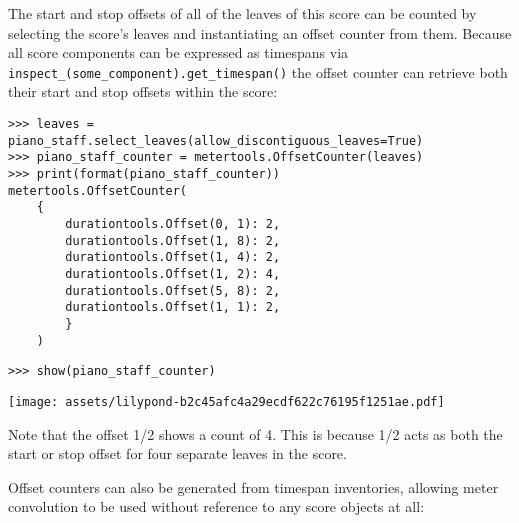 \noindent The start and stop offsets of all of the leaves of this score can be
counted by selecting the score's leaves and instantiating an offset counter
from them. Because all score components can be expressed as timespans via
\texttt{inspect\_(some\_component).get\_timespan()} the offset counter can
retrieve both their start and stop offsets within the score:

\begin{comment}
<abjad>
leaves = piano_staff.select_leaves(allow_discontiguous_leaves=True)
piano_staff_counter = metertools.OffsetCounter(leaves)
print(format(piano_staff_counter))
show(piano_staff_counter)
</abjad>
\end{comment}

\begin{abjadbookoutput}
\begin{singlespacing}
\vspace{-0.5\baselineskip}
\begin{lstlisting}
>>> leaves = piano_staff.select_leaves(allow_discontiguous_leaves=True)
>>> piano_staff_counter = metertools.OffsetCounter(leaves)
>>> print(format(piano_staff_counter))
metertools.OffsetCounter(
    {
        durationtools.Offset(0, 1): 2,
        durationtools.Offset(1, 8): 2,
        durationtools.Offset(1, 4): 2,
        durationtools.Offset(1, 2): 4,
        durationtools.Offset(5, 8): 2,
        durationtools.Offset(1, 1): 2,
        }
    )
\end{lstlisting}
\begin{lstlisting}
>>> show(piano_staff_counter)
\end{lstlisting}
\noindent\texttt{[image: assets/lilypond-b2c45afc4a29ecdf622c76195f1251ae.pdf]}
\end{singlespacing}
\end{abjadbookoutput}

\noindent Note that the offset 1/2 shows a count of 4. This is because 1/2 acts
as both the start or stop offset for four separate leaves in the score.

Offset counters can also be generated from timespan inventories, allowing meter
convolution to be used without reference to any score objects at all:

\begin{comment}
<abjad>
timespans = timespantools.TimespanInventory([
    timespantools.Timespan(-1, 10),
    timespantools.Timespan(5, 15),
    timespantools.Timespan(15, 20),
    timespantools.Timespan(10, 15),
    ])
timespan_counter = metertools.OffsetCounter(timespans)
show(timespan_counter)
</abjad>
\end{comment}

